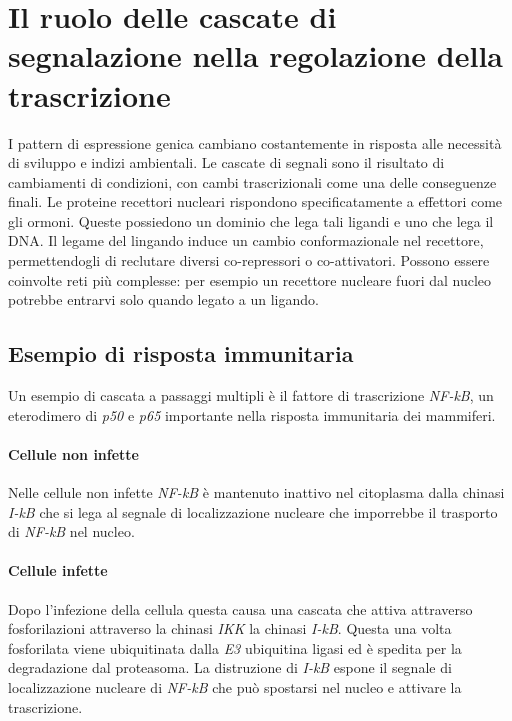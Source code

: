 \section{Il ruolo delle cascate di segnalazione nella regolazione della trascrizione}
I pattern di espressione genica cambiano costantemente in risposta alle necessit\`a di sviluppo e indizi ambientali. Le cascate di segnali sono il risultato di cambiamenti di condizioni,
con cambi trascrizionali come una delle conseguenze finali. Le proteine recettori nucleari rispondono specificatamente a effettori come gli ormoni. Queste possiedono un dominio che lega
tali ligandi e uno che lega il DNA. Il legame del lingando induce un cambio conformazionale nel recettore, permettendogli di reclutare diversi co-repressori o co-attivatori. Possono
essere coinvolte reti pi\`u complesse: per esempio un recettore nucleare fuori dal nucleo potrebbe entrarvi solo quando legato a un ligando. 
\subsection{Esempio di risposta immunitaria}
Un esempio di cascata a passaggi multipli \`e il fattore di trascrizione \emph{NF-kB}, un eterodimero di \emph{p50} e \emph{p65} importante nella risposta immunitaria dei mammiferi. 
\paragraph{Cellule non infette}
Nelle cellule non infette \emph{NF-kB} \`e mantenuto inattivo nel citoplasma dalla chinasi \emph{I-kB} che si lega al segnale di localizzazione nucleare che imporrebbe il trasporto di 
\emph{NF-kB} nel nucleo. 
\paragraph{Cellule infette}
Dopo l'infezione della cellula questa causa una cascata che attiva attraverso fosforilazioni attraverso la chinasi \emph{IKK} la chinasi \emph{I-kB}. Questa una volta fosforilata
viene ubiquitinata dalla \emph{E3} ubiquitina ligasi ed \`e spedita per la degradazione dal proteasoma. La distruzione di \emph{I-kB} espone il segnale di localizzazione nucleare di
\emph{NF-kB} che pu\`o spostarsi nel nucleo e attivare la trascrizione.
